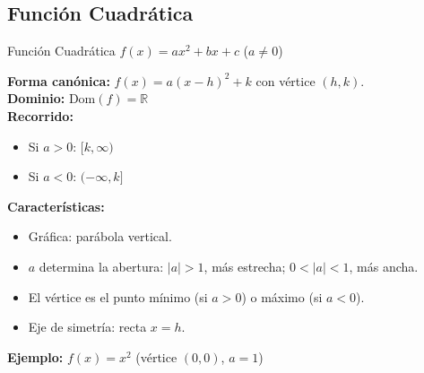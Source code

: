 \documentclass[12pt,a4paper]{article}
\newcommand{\Dominio}{\ensuremath{\mathrm{Dom}}}
\begin{document}
\subsection{Función Cuadrática}
\begin{funcbox}{Función Cuadrática $f(x)=ax^2+bx+c$ \quad ($a\neq 0$)}
\begin{minipage}[t]{0.55\textwidth}
    \textbf{Forma canónica:} $f(x)=a(x-h)^2+k$ con vértice $(h,k)$.\\
    \textbf{Dominio:} $\Dominio(f)=\mathbb{R}$\\
    \textbf{Recorrido:}
    \begin{itemize}
        \item Si $a>0$: $[k,\infty)$
        \item Si $a<0$: $(-\infty, k]$
    \end{itemize}
    \textbf{Características:}
    \begin{itemize}
        \item Gráfica: parábola vertical.
        \item $a$ determina la abertura: $|a|>1$, más estrecha; $0<|a|<1$, más ancha.
        \item El vértice es el punto mínimo (si $a>0$) o máximo (si $a<0$).
        \item Eje de simetría: recta $x=h$.
    \end{itemize}
    \textbf{Ejemplo:} $f(x)=x^2$ (vértice $(0,0)$, $a=1$)
\end{minipage}\hfill
\begin{minipage}[t]{0.4\textwidth}
    \centering
\end{minipage}
\end{funcbox}

\end{document}
